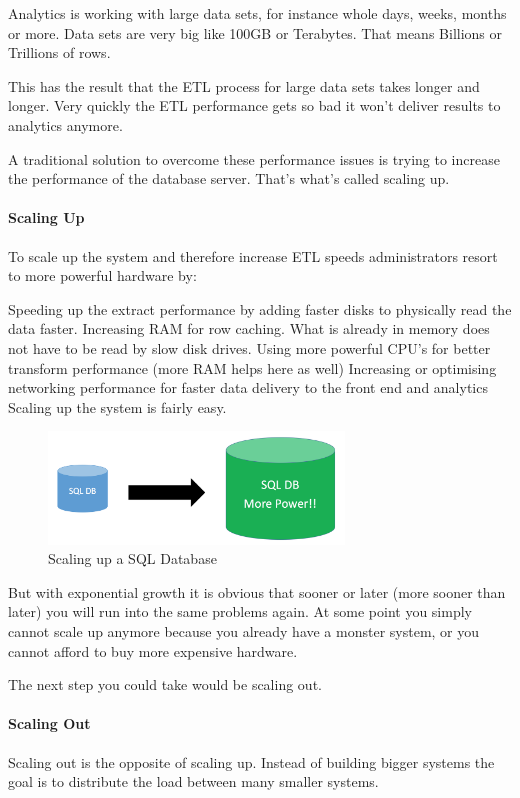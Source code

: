\documentclass[12pt]{scrartcl} %
\begin{document}
Analytics is working with large data sets, for instance whole days, weeks, months or more. Data sets are very big like 100GB or Terabytes. That means Billions or Trillions of rows.

This has the result that the ETL process for large data sets takes longer and longer. Very quickly the ETL performance gets so bad it won’t deliver results to analytics anymore.

A traditional solution to overcome these performance issues is trying to increase the performance of the database server. That’s what’s called scaling up.

\paragraph{Scaling Up}
To scale up the system and therefore increase ETL speeds administrators resort to more powerful hardware by:

Speeding up the extract performance by adding faster disks to physically read the data faster.
Increasing RAM for row caching. What is already in memory does not have to be read by slow disk drives.
Using more powerful CPU’s for better transform performance (more RAM helps here as well)
Increasing or optimising networking performance for faster data delivery to the front end and analytics
Scaling up the system is fairly easy.

\begin{figure}[htbp] 
  \centering
     \includegraphics[width=0.7\textwidth]{images/SQL-Scaling-UP}
  \caption{Scaling up a SQL Database}
  \label{fig:Bild1}
\end{figure}

But with exponential growth it is obvious that sooner or later (more sooner than later) you will run into the same problems again. At some point you simply cannot scale up anymore because you already have a monster system, or you cannot afford to buy more expensive hardware.

The next step you could take would be scaling out.

\paragraph{Scaling Out}
Scaling out is the opposite of scaling up. Instead of building bigger systems the goal is to distribute the load between many smaller systems.
\end{document}
